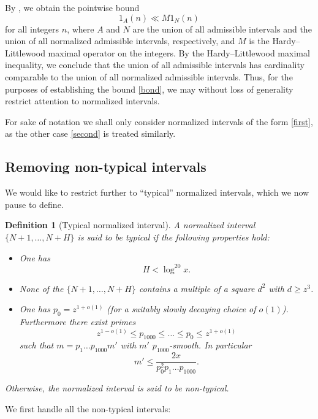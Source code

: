 \documentclass[12pt]{amsart}
\newtheorem{definition}[theorem]{Definition}
\begin{document}
By , we obtain the pointwise bound
$$ 1_A(n) \ll M 1_N(n)$$
for all integers $n$, where $A$ and $N$ are the union of all admissible intervals and the union of all normalized admissible intervals, respectively, and $M$ is the Hardy--Littlewood maximal operator on the integers.  By the Hardy--Littlewood maximal inequality, we conclude that the union of all admissible intervals has cardinality comparable to the union of all normalized admissible intervals.  Thus, for the purposes of establishing the bound \eqref{bond}, we may without loss of generality restrict attention to normalized intervals.

For sake of notation we shall only consider normalized intervals of the form \eqref{first}, as the other case \eqref{second} is treated similarly.

\subsection{Removing non-typical intervals}

We would like to restrict further to ``typical'' normalized intervals, which we now pause to define.

\begin{definition}[Typical normalized interval]\label{def-typical}  A normalized interval $\{N+1,\dots,N+H\}$ is said to be \emph{typical} if the following properties hold:
\begin{itemize}
    \item[(i)] One has
\begin{equation}\label{hup}
    H < \log^{20} x.
\end{equation}
    \item[(ii)] None of the $\{N+1,\dots,N+H\}$ contains a multiple of a square $d^2$ with $d \geq z^3$.
    \item[(iii)] One has $p_0 = z^{1+o(1)}$ (for a suitably slowly decaying choice of $o(1)$).  Furthermore there exist primes
$$ z^{1-o(1)} \leq p_{1000} \leq \dots \leq p_0 \leq z^{1+o(1)}$$
such that $m = p_1 \dots p_{1000} m'$ with $m'$ $p_{1000}$-smooth.  In particular
\begin{equation}\label{m'-bound}
    m' \leq \frac{2x}{p_0^2 p_1 \dots p_{1000}}.
\end{equation}
\end{itemize}
Otherwise, the normalized interval is said to be \emph{non-typical}.
\end{definition}

We first handle all the non-typical intervals:
\end{document}
